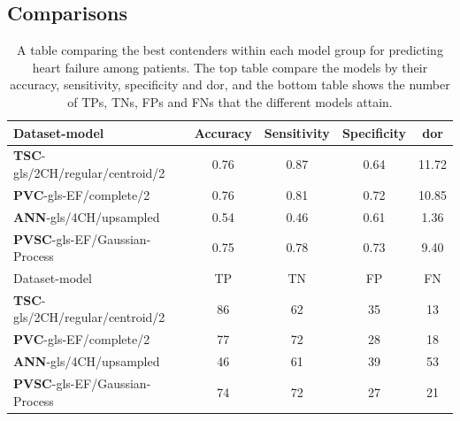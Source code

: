 \clearpage
\subsection{Comparisons}

\begin{table}
    \centering
    \begin{tabular}{lcccc}
        \toprule
        Dataset-model                           &  Accuracy &  Sensitivity &  Specificity &  \acrshort{dor} \\
        \midrule
        \textbf{TSC}-gls/2CH/regular/centroid/2 &      0.76 &         0.87 &         0.64 & 11.72 \\
        \textbf{PVC}-gls-EF/complete/2          &      0.76 &         0.81 &         0.72 & 10.85 \\
        \textbf{ANN}-gls/4CH/upsampled          &      0.54 &         0.46 &         0.61 & 1.36 \\
        \textbf{PVSC}-gls-EF/Gaussian-Process   &      0.75 &         0.78 &         0.73 & 9.40 \\
        \midrule
        Dataset-model                           &  TP &  TN &  FP &  FN \\
        \midrule
        \textbf{TSC}-gls/2CH/regular/centroid/2 &  86 &  62 &  35 &  13 \\
        \textbf{PVC}-gls-EF/complete/2          &  77 &  72 &  28 &  18 \\
        \textbf{ANN}-gls/4CH/upsampled          &  46 &  61 &  39 &  53 \\
        \textbf{PVSC}-gls-EF/Gaussian-Process   &  74 &  72 &  27 &  21 \\
        \bottomrule
    \end{tabular}
    \caption{A table comparing the best contenders within each model group for predicting heart failure among patients. The top table compare the models by their accuracy, sensitivity, specificity and \acrshort{dor}, and the bottom table shows the number of TPs, TNs, FPs and FNs that the different models attain.}
    \label{tab:hf_compare}
\end{table}

